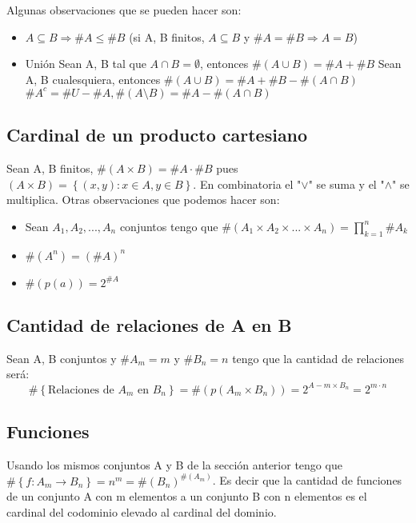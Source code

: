 \documentclass{article}
\newcommand{\card}[1]{\##1}
\begin{document}
Algunas observaciones que se pueden hacer son: \begin{itemize}
    \item $A \subseteq B \Rightarrow \card{A} \leq \card{B}$ (si A, B finitos, $A \subseteq B$ y $\card{A}=\card{B} \Rightarrow A = B$) 
    \item Unión
        \subitem Sean A, B tal que $A \cap B = \emptyset$, entonces $\card{(A \cup B)} = \card{A} + \card{B}$ 
        \subitem Sean A, B cualesquiera, entonces $\card{(A \cup B)} = \card{A} + \card{B} - \card{(A \cap B)}$
        \subitem $\card{A^c} = \card{U} - \card{A}, \card{(A \setminus B)} = \card{A} - \card{(A \cap B)}$      
\end{itemize}

\subsection{Cardinal de un producto cartesiano}
Sean A, B finitos, $\card{(A \times B)} = \card{A} \cdot \card{B}$ pues $(A \times B) = \left\{(x,y): x \in A, y \in B\right\}$. En combinatoria el "$\lor$" se suma y el "$\land$" se multiplica. Otras observaciones que podemos hacer son: \begin{itemize}
    \item Sean $A_1, A_2,...,A_n$ conjuntos tengo que $\card{(A_1 \times A_2 \times ... \times A_n)} = \prod_{k=1}^n \card{A_k}$
    \item $\card{(A^n)} = (\card{A})^n$
    \item $\card{(p(a))} = 2^{\card{A}}$
\end{itemize}

\subsection{Cantidad de relaciones de A en B}
Sean A, B conjuntos y $\card{A_m} = m$ y $\card{B_n} = n$ tengo que la cantidad de relaciones será:
\begin{equation}
    \card{\left\{\text{Relaciones de $A_m$ en $B_n$}\right\}} = \card{(p(A_m \times B_n))} = 2^{A-m \times B_n} = 2 ^{m \cdot n}
\end{equation}

\subsection{Funciones}
Usando los mismos conjuntos A y B de la sección anterior tengo que $\card{\left\{f: A_m \rightarrow B_n\right\}} = n^m = \card{(B_n)}^{\card{(A_m)}}$. Es decir que la cantidad de funciones de un conjunto A con m elementos a un conjunto B con n elementos es el cardinal del codominio elevado al cardinal del dominio.
\end{document}
